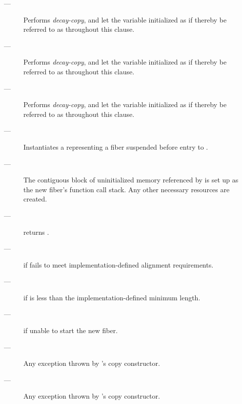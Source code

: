 \effects
\begin{description}
    \item[---] Performs \emph{decay-copy}, and let the variable initialized as if thereby be referred to as  throughout this clause.
    \item[---] Performs \emph{decay-copy}, and let the variable initialized as if thereby be referred to as  throughout this clause.
    \item[---] Performs \emph{decay-copy}, and let the variable initialized as if thereby be referred to as  throughout this clause.
    \item[---] Instantiates a \fiber representing a fiber suspended before
              entry to .
    \item[---] The contiguous block of uninitialized memory referenced
              by  is set up as the new fiber's function call stack.
              Any other necessary resources are created.
\end{description}

\postcond
\begin{description}
    \item[---] \emptyfn returns \false.
\end{description}

\except
\begin{description}
    \item[---]  if  fails to meet
               implementation-defined alignment requirements.
    \item[---]  if  is less than the
               implementation-defined minimum length.
    \item[---]  if unable to start the new fiber.
    \item[---] Any exception thrown by 's copy constructor.
    \item[---] Any exception thrown by 's copy constructor.
\end{description}

